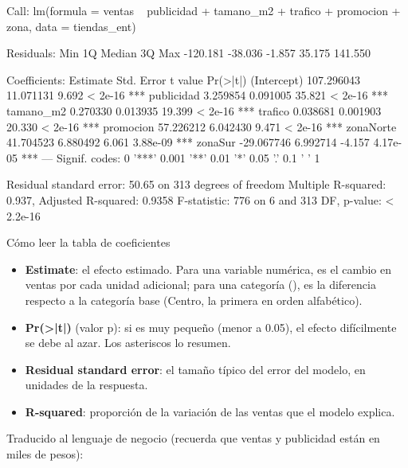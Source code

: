 \begin{rsalida}

Call:
lm(formula = ventas ~ publicidad + tamano_m2 + trafico + promocion + 
    zona, data = tiendas_ent)

Residuals:
     Min       1Q   Median       3Q      Max 
-120.181  -38.036   -1.857   35.175  141.550 

Coefficients:
              Estimate Std. Error t value Pr(>|t|)    
(Intercept) 107.296043  11.071131   9.692  < 2e-16 ***
publicidad    3.259854   0.091005  35.821  < 2e-16 ***
tamano_m2     0.270330   0.013935  19.399  < 2e-16 ***
trafico       0.038681   0.001903  20.330  < 2e-16 ***
promocion    57.226212   6.042430   9.471  < 2e-16 ***
zonaNorte    41.704523   6.880492   6.061 3.88e-09 ***
zonaSur     -29.067746   6.992714  -4.157 4.17e-05 ***
---
Signif. codes:  0 '***' 0.001 '**' 0.01 '*' 0.05 '.' 0.1 ' ' 1

Residual standard error: 50.65 on 313 degrees of freedom
Multiple R-squared:  0.937,	Adjusted R-squared:  0.9358 
F-statistic:   776 on 6 and 313 DF,  p-value: < 2.2e-16
\end{rsalida}

\begin{concepto}{Cómo leer la tabla de coeficientes}
\begin{itemize}
  \item \textbf{Estimate}: el efecto estimado. Para una variable numérica, es
        el cambio en ventas por cada unidad adicional; para una categoría
        (), es la diferencia respecto a la categoría base
        (Centro, la primera en orden alfabético).
  \item \textbf{Pr(>|t|)} (valor p): si es muy pequeño (menor a 0.05), el
        efecto difícilmente se debe al azar. Los asteriscos lo resumen.
  \item \textbf{Residual standard error}: el tamaño típico del error del
        modelo, en unidades de la respuesta.
  \item \textbf{R-squared}: proporción de la variación de las ventas que el
        modelo explica.
\end{itemize}
\end{concepto}

Traducido al lenguaje de negocio (recuerda que ventas y publicidad están en
miles de pesos):

